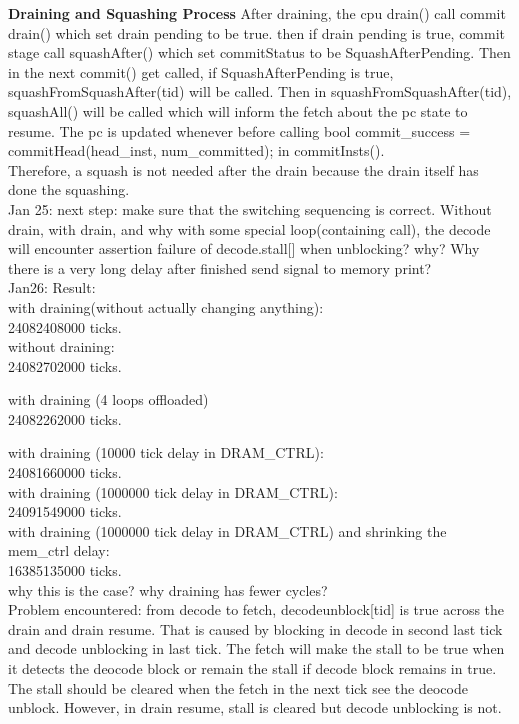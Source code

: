 \documentclass[11pt]{article}
\begin{document}
\textbf{Draining and Squashing Process}
After draining, the cpu drain() call commit drain() which set drain pending to be true. then if drain pending is true, commit stage call squashAfter() which set commitStatus to be SquashAfterPending. Then in the next commit() get called, if SquashAfterPending is true, squashFromSquashAfter(tid) will be called. Then in squashFromSquashAfter(tid), squashAll() will be called which will inform the fetch about the pc state to resume. The pc is updated whenever before calling bool commit\_success = commitHead(head\_inst, num\_committed); in commitInsts().\\

Therefore, a squash is not needed after the drain because the drain itself has done the squashing.\\

Jan 25: next step: make sure that the switching sequencing is correct. Without drain, with drain, and why with some special loop(containing call), the decode will encounter assertion failure of decode.stall[] when unblocking? why? Why there is a very long delay after finished send signal to memory print?\\

Jan26: Result: \\

with draining(without actually changing anything):  \\24082408000 ticks.\\

without draining: \\24082702000 ticks.

with draining (4 loops offloaded) \\
24082262000 ticks.

with draining (10000 tick delay in DRAM\_CTRL):\\
24081660000 ticks.\\

with draining (1000000 tick delay in DRAM\_CTRL):\\
24091549000 ticks.\\

with draining (1000000 tick delay in DRAM\_CTRL) and shrinking the mem\_ctrl delay:\\
16385135000 ticks.\\

why this is the case? why draining has fewer cycles?\\

Problem encountered: from decode to fetch, decodeunblock[tid] is true across the drain and drain resume. That is caused by blocking in decode in second last tick and decode unblocking in last tick. The fetch will make the stall to be true when it detects the deocode block or remain the stall if decode block remains in true. The stall should be cleared when the fetch in the next tick see the deocode unblock. However, in drain resume, stall is cleared but decode unblocking is not. \\
\end{document}
